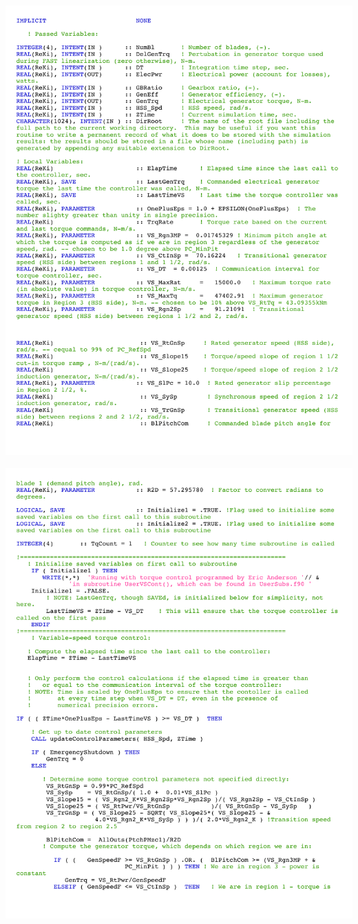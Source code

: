 \noindent
\includegraphics[width=\linewidth]{Figures/AppendixDFigures/figD-2B.pdf}

\noindent
\includegraphics[width=\linewidth]{Figures/AppendixDFigures/figD-2C.pdf}


